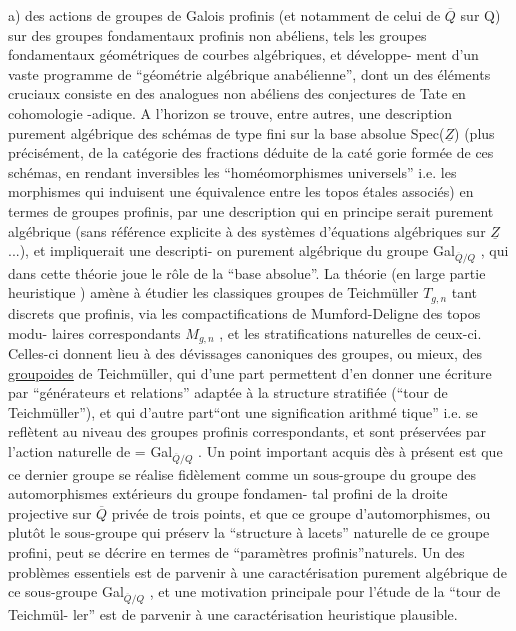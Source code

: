 a)   des actions de groupes de Galois profinis (et notamment de
celui de $\overline{Q}$ sur Q) sur des groupes fondamentaux profinis non abéliens,  tels
les groupes fondamentaux géométriques de courbes algébriques,  et développe-%
ment d'un vaste programme de ``géométrie algébrique anabélienne'', dont un des
éléments cruciaux consiste en des analogues non abéliens des conjectures
de Tate en cohomologie \hand{$\ell$}-adique. A l'horizon se trouve,  entre autres, une
description purement algébrique des schémas de type fini sur la base absolue
Spec($\underline{Z}$) (plus précisément,  de la catégorie des fractions déduite de la caté
gorie formée de ces schémas,  en rendant inversibles les ``homéomorphismes
universels'' i.e. les morphismes qui induisent une équivalence entre les 
topos étales associés) en termes de groupes profinis,  par une description
qui en principe serait purement algébrique (sans référence explicite à des
systèmes d'équations algébriques sur $\underline{Z}$ ...),  et impliquerait une descripti-%
on purement algébrique du groupe Gal$_{\overline{Q}/Q}$ ,  qui dans cette théorie joue le
rôle de la ``base absolue''.  La théorie (en large partie heuristique )
amène à étudier les classiques groupes de Teichmüller $T_{g,n}$  tant discrets
que profinis,  via les compactifications de Mumford-Deligne des topos modu-%
laires correspondants $M_{g,n}$ ,  et les stratifications naturelles de ceux-ci.
Celles-ci donnent lieu à des dévissages canoniques des groupes, ou mieux,
des \uline{groupoides} de Teichmüller,  qui d'une part permettent d'en donner une
écriture par ``générateurs et relations'' adaptée à la structure stratifiée
(``tour de Teichmüller''),  et qui d'autre part``ont une signification arithmé\xout{-}%
tique'' i.e. se reflètent au niveau des groupes profinis correspondants,  et
sont préservées par l'action naturelle de \hand{$\Gamma$} = Gal$_{\overline{Q}/Q}$ .  Un point important
acquis dès à présent est que ce dernier groupe se réalise fidèlement comme
un sous-groupe du groupe des automorphismes extérieurs du groupe fondamen-%
tal profini de la droite projective sur $\overline{Q}$ privée de trois points, et que ce
groupe d'automorphismes,  ou plutôt le sous-groupe qui préserv
la ``structure à lacets'' naturelle de ce groupe profini,  peut se décrire en
termes de ``paramètres profinis''naturels.  Un des problèmes essentiels est
de parvenir à une caractérisation purement algébrique de ce sous-groupe
Gal$_{\overline{Q}/Q}$ ,  et une motivation principale pour l'étude de la ``tour de Teichmül-%
ler'' est de parvenir à une caractérisation heuristique plausible.

